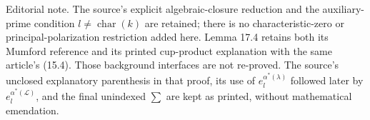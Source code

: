\documentclass[11pt]{article}
\newcommand{\AVeditorial}[1]{\par\smallskip\noindent\textsf{Editorial note.} #1\par\smallskip}
\begin{document}
\AVeditorial{The source's explicit algebraic-closure reduction and the
auxiliary-prime condition $l\ne\operatorname{char}(k)$ are retained;
there is no characteristic-zero or principal-polarization restriction
added here. Lemma 17.4 retains both its Mumford reference and its printed
cup-product explanation with the same article's (15.4). Those background
interfaces are not re-proved. The source's unclosed explanatory parenthesis
in that proof, its use of $e_l^{\alpha^*(\lambda)}$ followed later by
$e_l^{\alpha^*(\mathcal L)}$, and the final unindexed $\sum$ are kept
as printed, without mathematical emendation.}
\end{document}

